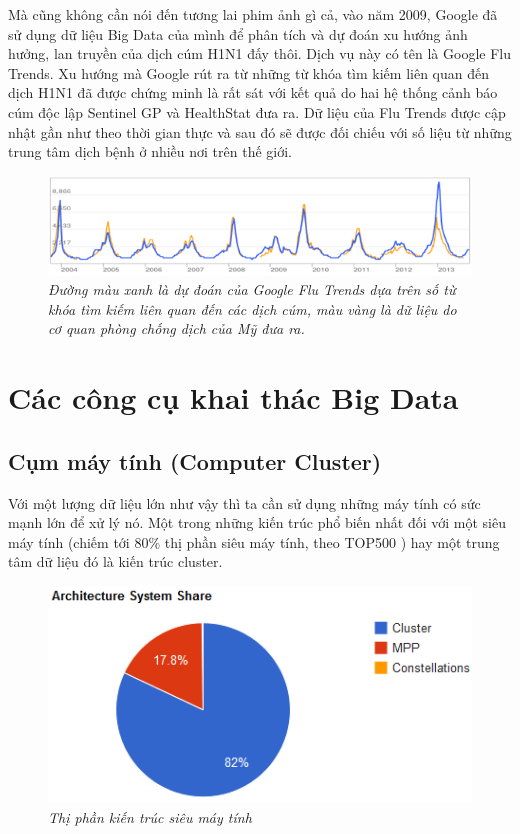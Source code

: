 \documentclass[12pt]{report}
\begin{document}
Mà cũng không cần nói đến tương lai phim ảnh gì cả, vào năm 2009, Google đã sử dụng dữ liệu Big Data của mình để phân tích và dự đoán xu hướng ảnh hưởng, lan truyền của dịch cúm H1N1 đấy thôi. Dịch vụ này có tên là Google Flu Trends. Xu hướng mà Google rút ra từ những từ khóa tìm kiếm liên quan đến dịch H1N1 đã được chứng minh là rất sát với kết quả do hai hệ thống cảnh báo cúm độc lập Sentinel GP và HealthStat đưa ra. Dữ liệu của Flu Trends được cập nhật gần như theo thời gian thực và sau đó sẽ được đối chiếu với số liệu từ những trung tâm dịch bệnh ở nhiều nơi trên thế giới.

\begin{figure}[H]
\centering
\includegraphics[scale=1]{graph.png}
\caption{\it Đường màu xanh là dự đoán của Google Flu Trends dựa trên số từ khóa tìm kiếm liên quan đến các dịch cúm, màu vàng là dữ liệu do cơ quan phòng chống dịch của Mỹ đưa ra.}
\end{figure}

\section{Các công cụ khai thác Big Data}
\subsection{Cụm máy tính (Computer Cluster)}
Với một lượng dữ liệu lớn như vậy thì ta cần sử dụng những máy tính có sức mạnh lớn để xử lý nó. Một trong những kiến trúc phổ biến nhất đối với một siêu máy tính (chiếm tới 80\% thị phần siêu máy tính, theo TOP500 \cite{top500}) hay một trung tâm dữ liệu đó là kiến trúc cluster.
\begin{figure}[H]
\centering
\includegraphics[scale=1]{top500.png}
\caption{\it Thị phần kiến trúc siêu máy tính}
\end{figure}
\end{document}
